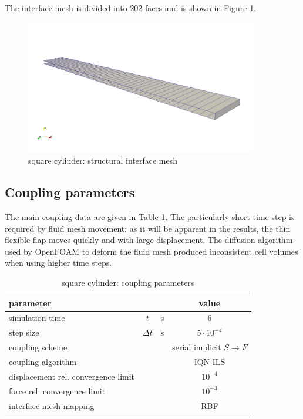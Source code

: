 The interface mesh is divided into 202 faces and is shown in Figure \ref{fig:sq_struct_mesh}. 

\begin{figure}[htbp!]
	\centering
	\includegraphics[width=0.9\textwidth, trim=0 50 0 200, clip]{images/sq-cyl/sq_struct_mesh.png}
	\caption{square cylinder: structural interface mesh}
	\label{fig:sq_struct_mesh}
\end{figure}


\subsection{Coupling parameters}


The main coupling data are given in Table \ref{table:sq-coupling}. The particularly short time step is required by fluid mesh movement: as it will be apparent in the results, the thin flexible flap moves quickly and with large displacement. The diffusion algorithm used by OpenFOAM to deform the fluid mesh produced inconsistent cell volumes when using higher time steps. 

\begin{table}[!htb]
	\begin{center}
		\begin{tabular}{ l c  l| c } 
			parameter & & & value   \\ 
			\hline
			simulation time  & $t$& \si{s} & 6      \\
			step size & $\Delta t$ & \si{s} & $5 \cdot 10^{-4}$   \\
			\hline
			coupling scheme & & & serial implicit  $S\rightarrow F$  \\
			coupling algorithm & & &  IQN-ILS  \\
			displacement rel. convergence limit & & & $10^{-4}$ \\
			force rel. convergence limit &&  & $10^{-3}$  \\
      		interface mesh mapping & & & RBF  \\
			
		\end{tabular}
	\end{center}
	\caption{square cylinder: coupling parameters}
	\label{table:sq-coupling}
\end{table}

